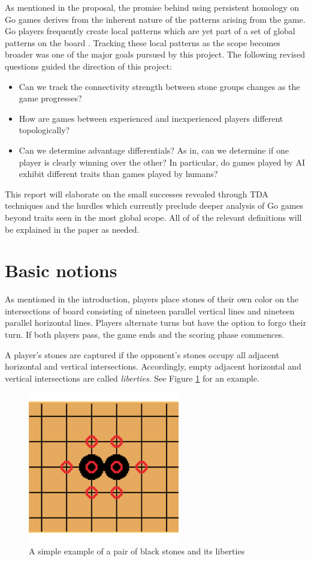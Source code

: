 \documentclass[11pt]{article}
\begin{document}
As mentioned in the proposal, the promise behind using persistent homology on Go games derives from the inherent nature of the patterns arising from the game. Go players frequently create local patterns which are yet part of a set of global patterns on the board \cite{bays}. Tracking these local patterns as the scope becomes broader was one of the major goals pursued by this project. The following revised questions guided the direction of this project:
\begin{itemize}
  \item Can we track the connectivity strength between stone groups changes as the game progresses?
  \item How are games between experienced and inexperienced players different topologically?
  \item Can we determine advantage differentials? As in, can we determine if one player is clearly winning over the other? In particular, do games played by AI exhibit different traits than games played by humans?
\end{itemize}

This report will elaborate on the small successes revealed through TDA techniques and the hurdles which currently preclude deeper analysis of Go games beyond traits seen in the most global scope. All of of the relevant definitions will be explained in the paper as needed.

\section{Basic notions} \label{notions}
As mentioned in the introduction, players place stones of their own color on the intersections of board consisting of nineteen parallel vertical lines and nineteen parallel horizontal lines. Players alternate turns but have the option to forgo their turn. If both players pass, the game ends and the scoring phase commences.

A player's stones are captured if the opponent's stones occupy all adjacent horizontal and vertical intersections. Accordingly, empty adjacent horizontal and vertical intersections are called \textit{liberties}. See Figure \ref{fig:lib1} for an example.

\begin{figure}[ht]
  \centering
  \includegraphics{lib1.png}
  \caption{A simple example of a pair of black stones and its liberties}
  \label{fig:lib1}
\end{figure}
\end{document}
